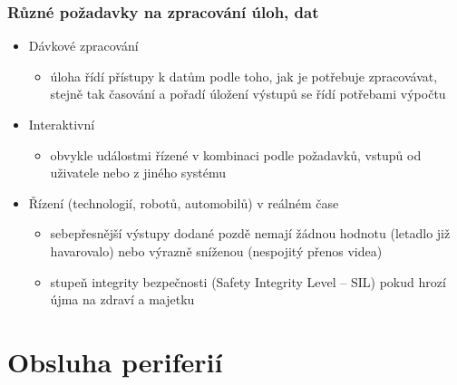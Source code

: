 \documentclass{beamer}
\begin{document}
\begin{frame}
\frametitle{Různé požadavky na zpracování úloh, dat}

\begin{itemize}
 \item Dávkové zpracování
 \begin{itemize}
  \item úloha řídí přístupy k datům podle toho, jak je potřebuje zpracovávat, stejně tak časování a pořadí úložení výstupů se řídí potřebami výpočtu
 \end{itemize}
 \item Interaktivní
 \begin{itemize}
  \item obvykle událostmi řízené v kombinaci podle požadavků, vstupů od uživatele nebo z jiného systému
 \end{itemize}
 \item Řízení (technologií, robotů, automobilů) v reálném čase
 \begin{itemize}
  \item sebepřesnější výstupy dodané pozdě nemají žádnou hodnotu (letadlo již havarovalo) nebo výrazně sníženou (nespojitý přenos videa)
  \item stupeň integrity bezpečnosti (Safety Integrity Level -- SIL) pokud hrozí újma na zdraví a majetku
 \end{itemize}

\end{itemize}
\end{frame}

\section{Obsluha periferií}
\end{document}
